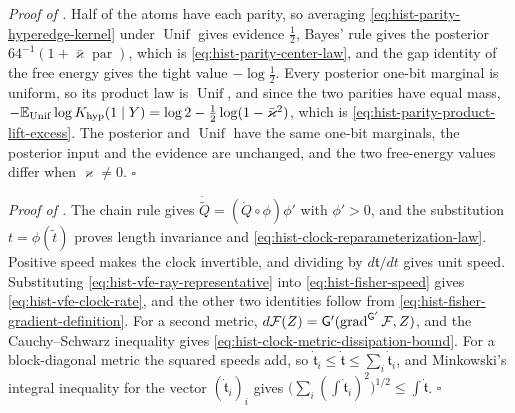 \noindent\emph{Proof of .}
Half of the atoms have each parity, so averaging \eqref{eq:hist-parity-hyperedge-kernel}
under $\operatorname{Unif}$ gives evidence $\tfrac12$, Bayes' rule gives the posterior
$64^{-1}(1+\bar\varkappa\operatorname{par})$, which is \eqref{eq:hist-parity-center-law},
and the gap identity of the free energy gives the tight value $-\log\tfrac12$.  Every
posterior one-bit marginal is uniform, so its product law is $\operatorname{Unif}$, and
since the two parities have equal mass,
$-\mathbb E_{\operatorname{Unif}}\log K_{\mathrm{hyp}}(1\mid Y)
=\log2-\tfrac12\log(1-\bar\varkappa^2)$, which is
\eqref{eq:hist-parity-product-lift-excess}.  The posterior and $\operatorname{Unif}$ have
the same one-bit marginals, the posterior input and the evidence are unchanged, and the
two free-energy values differ when $\varkappa\ne0$.  $\square$

\noindent\emph{Proof of .}
The chain rule gives $\dot{\widetilde Q}=(\dot Q\circ\phi)\phi'$ with $\phi'>0$, and the
substitution $t=\phi(\widetilde t)$ proves length invariance and
\eqref{eq:hist-clock-reparameterization-law}.  Positive speed makes the clock invertible,
and dividing by $d\mathfrak t/dt$ gives unit speed.  Substituting
\eqref{eq:hist-vfe-ray-representative} into \eqref{eq:hist-fisher-speed} gives
\eqref{eq:hist-vfe-clock-rate}, and the other two identities follow from
\eqref{eq:hist-fisher-gradient-definition}.  For a second metric,
$d\mathcal F(Z)=\mathsf G'(\operatorname{grad}^{\mathsf G'}\mathcal F,Z)$, and the
Cauchy--Schwarz inequality gives \eqref{eq:hist-clock-metric-dissipation-bound}.  For a
block-diagonal metric the squared speeds add, so
$\dot{\mathfrak t}_i\leq\dot{\mathfrak t}\leq\sum_i\dot{\mathfrak t}_i$, and Minkowski's
integral inequality for the vector $(\dot{\mathfrak t}_i)_i$ gives
$\bigl(\sum_i(\int\dot{\mathfrak t}_i)^2\bigr)^{1/2}\leq\int\dot{\mathfrak t}$.  $\square$

